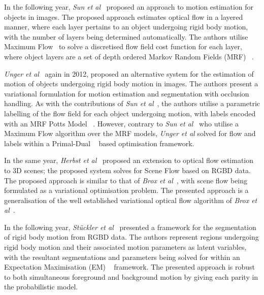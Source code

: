In the following year, \textit{Sun et al}~\cite{Sun2012} proposed an approach to motion estimation 
for objects in images. The proposed approach estimates optical flow in a layered manner, where each 
layer pertains to an object undergoing rigid body motion, with the number of layers being determined 
automatically. The authors utilise Maximum Flow~\cite{Lamich2017} to solve a discretised flow field cost 
function for each layer, where object layers are a set of depth ordered Markov Random Fields (MRF) 
~\cite{BishopPRML, Murphy2012ML}.

\textit{Unger et al}~\cite{Unger2012} again in 2012, proposed an alternative system for the 
estimation of motion of objects undergoing rigid body motion in images. The authors present a 
variational formulation for motion estimation and segmentation with occlusion handling. As with 
the contributions of \textit{Sun et al}~\cite{Sun2012}, the authors utilise a parametric labelling 
of the flow field for each object undergoing motion, with labels encoded with an MRF Potts Model 
~\cite{Levada2008}. However, contrary to \textit{Sun et al}~\cite{Sun2012} who utilise a Maximum Flow 
algorithm over the MRF models, \textit{Unger et al} solved for flow and labels within a Primal-Dual 
~\cite{Boyd2004Convex} based optimisation framework.

In the same year, \textit{Herbst et al}~\cite{Herbst2013} proposed an extension to optical 
flow estimation to 3D scenes; the proposed system solves for Scene Flow based on RGBD data. 
The proposed approach is similar to that of \textit{Brox et al}~\cite{Brox2004}, with scene flow 
being formulated as a variational optimisation problem. The presented approach is a generalisation 
of the well established variational optical flow algorithm of \textit{Brox et al}~\cite{Brox2004}.

In the following year, \textit{St{\"u}ckler et al}~\cite{Stueckler2013} presented a framework 
for the segmentation of rigid body motion from RGBD data. The authors represent regions undergoing 
rigid body motion and their associated motion parameters as latent variables, with the resultant 
segmentations and parameters being solved for within an Expectation Maximisation (EM) 
~\cite{BishopPRML, Murphy2012ML} framework. The presented approach is robust to both simultaneous 
foreground and background motion by giving each parity in the probabilistic model.


